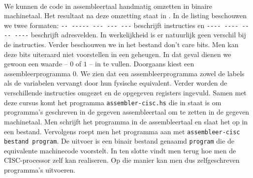 \paragraph{}
We kunnen de code in assembleertaal handmatig omzetten in binaire machinetaal. Het resultaat na deze omzetting staat in . In de listing beschouwen we twee formaten: \verb+-- ----- --- --- ---+ beschrijft instructies en \verb+---- ---- ---- ----+ beschrijft adresvelden. In werkelijkheid is er natuurlijk geen verschil bij de instructies. Verder beschouwen we in het bestand don't care bits. Men kan deze bits uiteraard niet voorstellen in een geheugen. In dat geval dienen we gewoon een waarde -- $0$ of $1$ -- in te vullen. Doorgaans kiest een assembleerprogramma $0$. We zien dat een assembleerprogramma zowel de labels als de variabelen vervangt door hun fysische equivalent. Verder worden de verschillende instructies omgezet en de opgegeven registers ingevuld. Samen met deze cursus komt het programma \verb+assembler-cisc.hs+ die in staat is om programma's geschreven in de gegeven assembleertaal om te zetten in de gegeven machinetaal. Men schrijft het programma in de assembleertaal en slaat het op in een bestand. Vervolgens roept men het programma aan met \verb+assembleer-cisc bestand program+. De uitvoer is een binair bestand genaamd \verb+program+ die de equivalente machinecode voorstelt. In  ten slotte vindt men terug hoe men de CISC-processor zelf kan realiseren. Op die manier kan men dus zelfgeschreven programma's uitvoeren.
